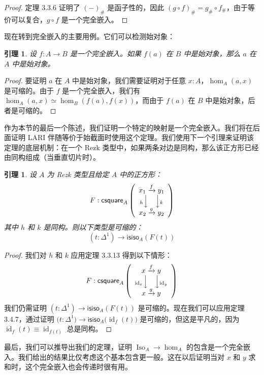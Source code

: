 \documentclass{ctexrep}
\theoremstyle{plain}
\newtheorem{lemma}[theorem]{引理}
\theoremstyle{definition}
\theoremstyle{remark}
\theoremstyle{definition}
\theoremstyle{definition}
\theoremstyle{definition}
\newcommand{\id}{\operatorname{id}}
\newcommand{\Iso}{\operatorname{Iso}}
\newcommand{\isiso}{\mathsf{isiso}}
\begin{document}
\begin{proof}
定理 3.3.6 证明了 $(-)_{\#}$ 是函子性的，因此 $(g\circ f)_{\#} = g_{\#}\circ f_{\#}$，由于等价可以复合，$g\circ f$ 是一个完全嵌入。
\end{proof}

现在转到完全嵌入的主要用例。它们可以检测始对象：

\begin{lemma}
设 $f:A\to B$ 是一个完全嵌入。如果 $f(a)$ 在 $B$ 中是始对象，那么 $a$ 在 $A$ 中是始对象。
\end{lemma}

\begin{proof}
要证明 $a$ 在 $A$ 中是始对象，我们需要证明对于任意 $x:A$，$\hom_A(a,x)$ 是可缩的。由于 $f$ 是一个完全嵌入，我们有 $\hom_A(a,x) \simeq \hom_B(f(a),f(x))$，而由于 $f(a)$ 在 $B$ 中是始对象，后者是可缩的。
\end{proof}

作为本节的最后一个陈述，我们证明一个特定的映射是一个完全嵌入。我们将在后面证明 LARI 伴随等价于始截面时使用这个定理。我们使用下一个引理来证明该定理的底层机制：在一个 Rezk 类型中，如果两条对边是同构，那么该正方形已经由同构组成（当垂直切片时）。

\begin{lemma}
设 $A$ 为 Rezk 类型且给定 $A$ 中的正方形：
\[
F : \mathsf{csquare}_A\left( \begin{array}{c} x_1 \xrightarrow{f} y_1 \\ {}_{h}\Big\downarrow\quad\Big\downarrow{}_{k} \\ x_2 \xrightarrow{g} y_2 \end{array} \right)
\]
其中 $h$ 和 $k$ 是同构。则以下类型是可缩的：
\[
(t : \Delta^1) \to \isiso_A(F(t))
\]
\end{lemma}

\begin{proof}
我们对 $h$ 和 $k$ 应用定理 3.3.13 得到以下情形：
\[
F : \mathsf{csquare}_A\left( \begin{array}{c} x \xrightarrow{f} y \\ {}_{\id_x}\Big\downarrow\quad\Big\downarrow{}_{\id_y} \\ x \xrightarrow{g} y \end{array} \right)
\]
我们仍需证明 $(t : \Delta^1) \to \isiso_A(F(t))$ 是可缩的。现在我们可以应用定理 3.4.7，通过证明 $\bigl(t : \Delta^1\bigr) \to \isiso_A\bigl(\id_f(t)\bigr)$ 是可缩的，但这是平凡的，因为 $\id_f(t) \equiv \id_{f(t)}$ 总是同构。
\end{proof}

最后，我们可以推导出我们的定理，证明 $\Iso_A \to \hom_A$ 的包含是一个完全嵌入。我们给出的结果比仅考虑这个基本包含更一般。这在以后证明当对 $x$ 和 $y$ 求和时，这个完全嵌入也会传递时很有用。
\end{document}
